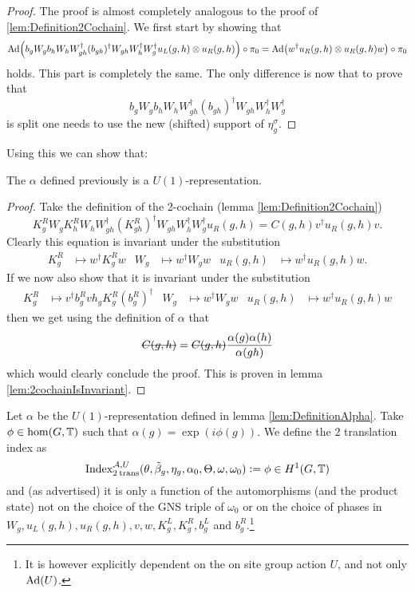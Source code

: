 \documentclass[11pt,a4paper,twoside]{article}
\numberwithin{equation}{section}
\begin{document}
\begin{proof}
The proof is almost completely analogous to the proof of \ref{lem:Definition2Cochain}. We first start by showing that
\begin{equation}
\Ad{b_g W_g b_h W_h W_{gh}^\dagger (b_{gh})^\dagger W_{gh}W_h^\dagger W_g^\dagger u_L(g,h)\otimes u_R(g,h)}\circ\pi_0=\Ad{w^\dagger u_R(g,h)\otimes u_R(g,h) w}\circ\pi_0
\end{equation}
holds. This part is completely the same. The only difference is now that to prove that
\begin{equation}
b_g W_g b_h W_h W_{gh}^\dagger (b_{gh})^\dagger W_{gh}W_h^\dagger W_g^\dagger
\end{equation}
 is split one needs to use the new (shifted) support of $\eta_g^\sigma$.
\end{proof}
Using this we can show that:
\begin{lemma}
	The $\alpha$ defined previously is a $U(1)$-representation.
\end{lemma}
\begin{proof}
	Take the definition of the 2-cochain (lemma \ref{lem:Definition2Cochain})
	\begin{equation}\label{eq:Definition2Cochain2TranslationSection}
		K_g^RW_gK_h^RW_hW_{gh}^\dagger(K_{gh}^R)^\dagger W_{gh}W_{h}^\dagger W_g^\dagger u_R(g,h)=C(g,h)v^\dagger u_R(g,h)v.
	\end{equation}
	Clearly this equation is invariant under the substitution
	\begin{align}
		K_g^R&\mapsto w^\dagger K_g^R w&W_g&\mapsto w^\dagger W_g w&u_R(g,h)&\mapsto w^\dagger u_R(g,h)w.
	\end{align}
	If we now also show that it is invariant under the substitution
	\begin{align}
		K_g^R&\mapsto v^\dagger b_g^R v h_g K_g^R (b_g^R)^\dagger&W_g&\mapsto w^\dagger W_g w&u_R(g,h)&\mapsto w^\dagger u_R(g,h)w
	\end{align}
	then we get using the definition of $\alpha$ that
	\begin{equation}
		\stkout{C(g,h)}=\stkout{C(g,h)}\frac{\alpha(g)\alpha(h)}{\alpha(gh)}
	\end{equation}
	which would clearly conclude the proof. This is proven in lemma \ref{lem:2cochainIsInvariant}.
\end{proof}
\begin{definition}
	Let $\alpha$ be the $U(1)$-representation defined in lemma \ref{lem:DefinitionAlpha}. Take $\phi\in\hom(G,\mathbb T)$ such that $\alpha(g)=\exp(i\phi(g))$. We define the 2 translation index as
	\begin{equation}
		\textrm{Index}_{2\:\text{trans}}^{\mathcal A,U}(\theta,\tilde{\beta}_g,\eta_g,\alpha_0,\Theta,\omega,\omega_0)\vcentcolon= \phi\in H^1(G,\mathbb T)
	\end{equation}
	and (as advertised) it is only a function of the automorphisms (and the product state) not on the choice of the GNS triple of $\omega_0$ or on the choice of phases in $W_g,u_L(g,h),u_R(g,h),v,w,K^L_g,K^R_g,b^L_g$ and $b^R_g$.\footnote{It is however explicitly dependent on the on site group action $U$, and not only $\Ad{U}$.}
\end{definition}
\end{document}
